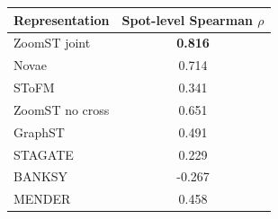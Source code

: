 \begin{tabular}{lc}
\toprule
Representation & \shortstack{Spot-level\\Spearman $\rho$} \\
\midrule
ZoomST joint & \textbf{0.816} \\
Novae & 0.714 \\
SToFM & 0.341 \\
ZoomST no cross & 0.651 \\
GraphST & 0.491 \\
STAGATE & 0.229 \\
BANKSY & -0.267 \\
MENDER & 0.458 \\
\bottomrule
\end{tabular}
